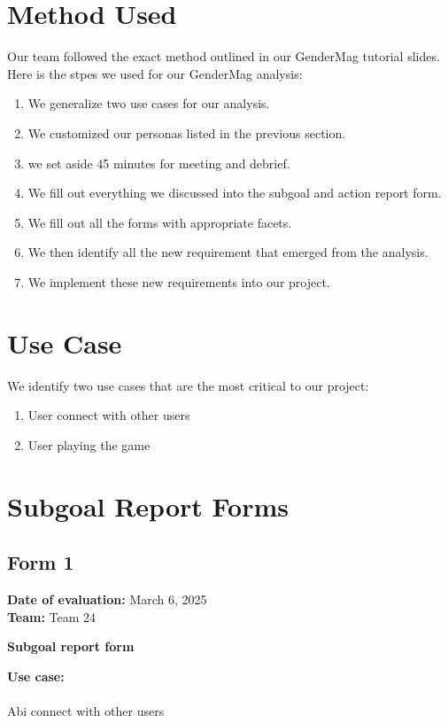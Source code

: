\documentclass[12pt, titlepage]{article}
\begin{document}
\section{Method Used}
Our team followed the exact method outlined in our GenderMag tutorial slides. Here is the stpes we used for our GenderMag analysis:
\begin{enumerate}
    \item We generalize two use cases for our analysis.
    \item We customized our personas listed in the previous section.
    \item we set aside 45 minutes for meeting and debrief.
    \item We fill out everything we discussed into the subgoal and action report form.
    \item We fill out all the forms with appropriate facets.
    \item We then identify all the new requirement that emerged from the analysis.
    \item We implement these new requirements into our project.
\end{enumerate}

\section{Use Case}
We identify two use cases that are the most critical to our project:
\begin{enumerate}
    \item User connect with other users
    \item User playing the game
\end{enumerate}

\section{Subgoal Report Forms}

\subsection{Form 1}

\noindent \textbf{Date of evaluation:} March 6, 2025\\
\textbf{Team:} Team 24

\vspace{0.5cm}
\noindent \textbf{\large Subgoal report form}

\vspace{0.3cm}
\noindent \textbf{Use case:} \\\\
Abi connect with other users
\end{document}
